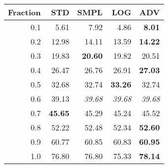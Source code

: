\documentclass{standalone}
\begin{document}
\begin{tabular}{r|rrrr}
      \toprule
      Fraction & STD & SMPL & LOG & ADV\\
      \midrule
      0.1 & 5.61 & 7.92 & 4.86 & \textbf{8.01}\\
  0.2 & 12.98 & 14.11 & 13.59 & \textbf{14.22}\\
  0.3 & 19.83 & \textbf{20.60} & 19.82 & 20.51\\
  0.4 & 26.47 & 26.76 & 26.91 & \textbf{27.03}\\
  0.5 & 32.68 & 32.74 & \textbf{33.26} & 32.74\\
  0.6 & 39.13 & \emph{39.68} & \emph{39.68} & \emph{39.68}\\
  0.7 & \textbf{45.65} & 45.29 & 45.24 & 45.52\\
  0.8 & 52.22 & 52.48 & 52.34 & \textbf{52.60}\\
  0.9 & 60.77 & 60.85 & 60.83 & \textbf{60.95}\\
  1.0 & 76.80 & 76.80 & 75.33 & \textbf{78.14}\\
  \bottomrule
\end{tabular}
\end{document}
